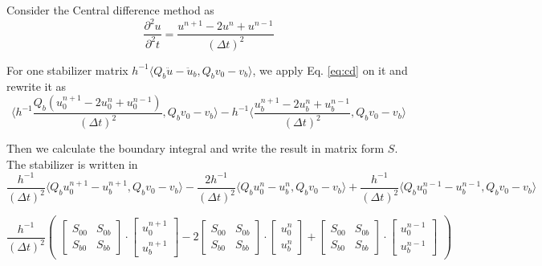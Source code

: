 Consider the Central difference method as 
\begin{equation} \label{eq:cd}
\frac{\partial^{2} u}{\partial^{2} t} = \frac{u^{n + 1} - 2 u ^{n} + u^{n - 1}}{(\Delta t)^{2}}
\end{equation}

For one stabilizer matrix $ h^{-1} \langle Q_{b} \ddot{u} - \ddot{u}_{b}, Q_{b} v_{0} - v_{b} \rangle $, we apply Eq. \eqref{eq:cd} on it and rewrite it as
\begin{equation}
\langle  h^{-1} \frac{Q_{b} (u^{n + 1}_{0} - 2 u ^{n}_{0} + u_{0}^{n - 1})}{(\Delta t)^{2}}, Q_{b} v_{0} - v_{b} \rangle - h^{-1} \langle \frac{u_{b}^{n + 1} - 2u_{b}^{n} + u_{b}^{n - 1}}{(\Delta t)^{2}} , Q_{b} v_{0} - v_{b} \rangle
\end{equation}

Then we calculate the boundary integral and write the result in matrix form $ S $. The stabilizer is written in
\begin{equation}
\frac{h^{-1}}{(\Delta t)^{2}} \langle Q_{b} u_{0}^{n + 1} - u_{b}^{n + 1} , Q_{b} v_{0}- v_{b} \rangle - \frac{2h^{-1}}{(\Delta t)^{2}} \langle Q_{b} u_{0}^{n} - u_{b}^{n} , Q_{b} v_{0}- v_{b} \rangle + \frac{h^{-1}}{(\Delta t)^{2}} \langle Q_{b} u_{0}^{n - 1} - u_{b}^{n - 1} , Q_{b} v_{0}- v_{b} \rangle 
\end{equation}


\begin{equation}
\frac{h^{-1}}{(\Delta t)^{2}} \begin{pmatrix}
\begin{bmatrix}
S_{00} & S_{0b} \\ S_{b0} & S_{bb} 
\end{bmatrix} \cdot 
\begin{bmatrix}
u_{0}^{n + 1} \\ u_{b}^{n + 1}
\end{bmatrix}
 - 2\begin{bmatrix}
S_{00} & S_{0b} \\ S_{b0} & S_{bb}
\end{bmatrix} \cdot
\begin{bmatrix}
u_{0}^{n} \\ u_{b}^{n}
\end{bmatrix} + 
\begin{bmatrix}
S_{00} & S_{0b} \\ S_{b0} & S_{bb} 
\end{bmatrix} \cdot
\begin{bmatrix}
u_{0}^{n - 1} \\ u_{b}^{n - 1}
\end{bmatrix}
\end{pmatrix}
\end{equation}

